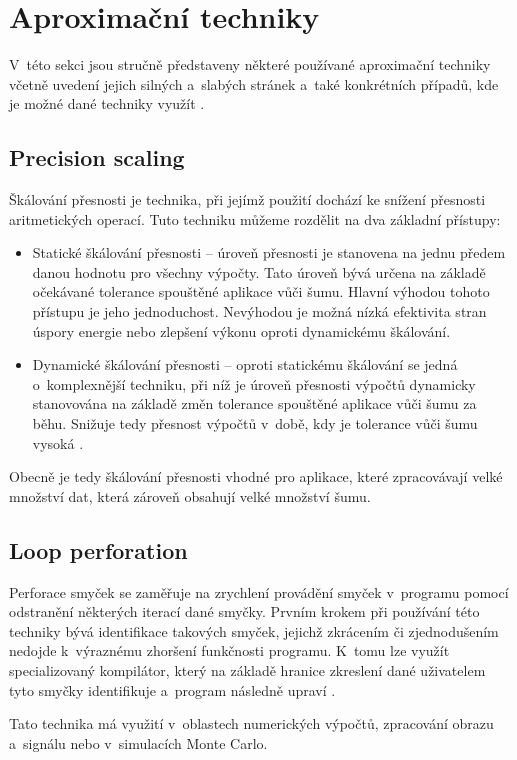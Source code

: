 \section{Aproximační techniky}
V~této sekci jsou stručně představeny některé používané aproximační techniky včetně uvedení jejich silných a~slabých stránek a~také konkrétních případů, kde je možné dané techniky využít \cite{ac_techniques}.

\subsection*{Precision scaling}
Škálování přesnosti je technika, při jejímž použití dochází ke snížení přesnosti aritmetických operací. Tuto techniku můžeme rozdělit na dva základní přístupy:
\begin{itemize}
    \item Statické škálování přesnosti -- úroveň přesnosti je stanovena na jednu předem danou hodnotu pro všechny výpočty. Tato úroveň bývá určena na základě očekávané tolerance spouštěné aplikace vůči šumu. Hlavní výhodou tohoto přístupu je jeho jednoduchost. Nevýhodou je možná nízká efektivita stran úspory energie nebo zlepšení výkonu oproti dynamickému škálování.
    \item Dynamické škálování přesnosti -- oproti statickému škálování se jedná o~komplexnější techniku, při níž je úroveň přesnosti výpočtů dynamicky stanovována na základě změn tolerance spouštěné aplikace vůči šumu za běhu. Snižuje tedy přesnost výpočtů v~době, kdy je tolerance vůči šumu vysoká \cite{precision_scaling}.
\end{itemize}

Obecně je tedy škálování přesnosti vhodné pro aplikace, které zpracovávají velké množství dat, která zároveň obsahují velké množství šumu.

\subsection*{Loop perforation}
Perforace smyček se zaměřuje na zrychlení provádění smyček v~programu pomocí odstranění některých iterací dané smyčky. Prvním krokem při používání této techniky bývá identifikace takových smyček, jejichž zkrácením či zjednodušením nedojde k~výraznému zhoršení funkčnosti programu. K~tomu lze využít specializovaný kompilátor, který na základě hranice zkreslení dané uživatelem tyto smyčky identifikuje a~program následně upraví \cite{code_perforation}.

Tato technika má využití v~oblastech numerických výpočtů, zpracování obrazu a~signálu nebo v~simulacích Monte Carlo.


